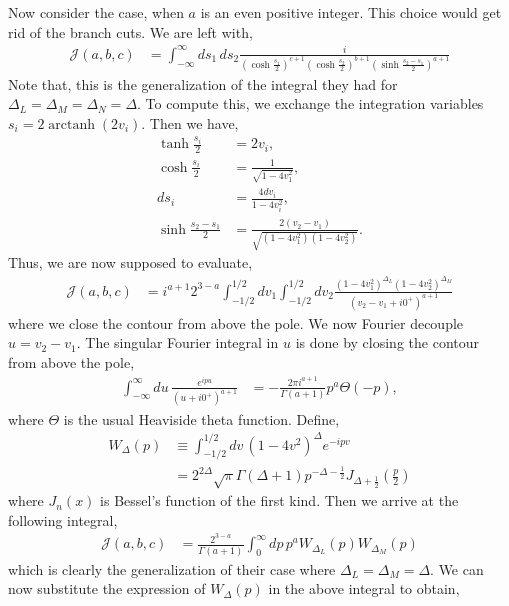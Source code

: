 \documentclass[11pt]{article}
\newcommand{\lb}{\left(}
\newcommand{\rb}{\right)}
\begin{document}
Now consider the case, when $a$ is an even positive integer. This choice would get rid of the branch cuts. We are left with,
\begin{align}
    \mathcal{J}(a,b,c) &= \int_{-\infty}^\infty ds_1 \, ds_2 \frac{i}{\lb\cosh\frac{s_1}{2}\rb^{c+1}\lb\cosh\frac{s_2}{2}\rb^{b+1}\lb\sinh\frac{s_2-s_1}{2}\rb^{a+1}}
\end{align}
Note that, this is the generalization of the integral they had for $\Delta_L = \Delta_M = \Delta_N = \Delta$. 
To compute this, we exchange the integration variables $s_i = 2\operatorname{arctanh}(2v_i)$. Then we have,
\begin{align}
    \tanh \frac{s_i}{2} &= 2v_i, \\
    \cosh\frac{s_i}{2} &= \frac{1}{\sqrt {1-4v_1^2}} ,\\ 
    ds_i &= \frac{4dv_i}{1-4v_i^2}, \\
    \sinh\frac{s_2 - s_1}{2} &= \frac{2(v_2 -v_1)}{\sqrt{(1-4v_1^2)(1-4v_2^2)}}.
\end{align}
Thus, we are now supposed to evaluate,
\begin{align}
    \mathcal{J}(a,b,c) &= i^{a+1} 2^{3-a} \int_{-1/2}^{1/2} dv_1 \int_{-1/2}^{1/2} dv_2 \frac{(1-4v_1^2)^{\Delta_L}(1-4v_2^2)^{\Delta_M}}{\lb v_2 - v_1 + i0^+\rb^{a+1}}
\end{align}
where we close the contour from above the pole. We now Fourier decouple $u = v_2 - v_1$. 
The singular Fourier integral in $u$ is done by closing the contour from above the pole, 
\begin{align}
    \int_{-\infty}^\infty du \, \frac{e^{ipu}}{\lb u + i0^+\rb^{a+1}} &= -\frac{2\pi i^{a+1}}{\Gamma(a+1)} p^a \Theta(-p),
\end{align}
where $\Theta$ is the usual Heaviside theta function. 
Define,
\begin{align}
    W_\Delta(p) &\equiv \int_{-1/2}^{1/2} dv\, \lb 1-4v^2 \rb^\Delta e^{-ipv} \\
    &= 2^{2\Delta}\sqrt \pi \Gamma(\Delta + 1) p^{-\Delta - \frac{1}{2}} J_{\Delta + \frac{1}{2}}(\frac{p}{2})
\end{align}
where $J_n(x)$ is Bessel's function of the first kind. 
Then we arrive at the following integral,
\begin{align}
    \mathcal{J}(a,b,c) &= \frac{2^{3-a}}{\Gamma(a+1)}\int_0^\infty dp \, p^a W_{\Delta_L}(p)W_{\Delta_M}(p) 
\end{align}
which is clearly the generalization of their case where $\Delta_L = \Delta_M = \Delta$. We can now substitute the expression of $W_\Delta(p)$ in the above integral to obtain,
\end{document}
